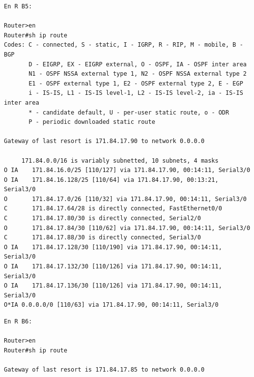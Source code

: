 \documentclass[twoside, 11pt]{article}
\begin{document}
\begin{enumerate}
\begin{center}
\begin{verbatim}
En R B5:

Router>en
Router#sh ip route
Codes: C - connected, S - static, I - IGRP, R - RIP, M - mobile, B - BGP
       D - EIGRP, EX - EIGRP external, O - OSPF, IA - OSPF inter area
       N1 - OSPF NSSA external type 1, N2 - OSPF NSSA external type 2
       E1 - OSPF external type 1, E2 - OSPF external type 2, E - EGP
       i - IS-IS, L1 - IS-IS level-1, L2 - IS-IS level-2, ia - IS-IS inter area
       * - candidate default, U - per-user static route, o - ODR
       P - periodic downloaded static route

Gateway of last resort is 171.84.17.90 to network 0.0.0.0

     171.84.0.0/16 is variably subnetted, 10 subnets, 4 masks
O IA    171.84.16.0/25 [110/127] via 171.84.17.90, 00:14:11, Serial3/0
O IA    171.84.16.128/25 [110/64] via 171.84.17.90, 00:13:21, Serial3/0
O       171.84.17.0/26 [110/32] via 171.84.17.90, 00:14:11, Serial3/0
C       171.84.17.64/28 is directly connected, FastEthernet0/0
C       171.84.17.80/30 is directly connected, Serial2/0
O       171.84.17.84/30 [110/62] via 171.84.17.90, 00:14:11, Serial3/0
C       171.84.17.88/30 is directly connected, Serial3/0
O IA    171.84.17.128/30 [110/190] via 171.84.17.90, 00:14:11, Serial3/0
O IA    171.84.17.132/30 [110/126] via 171.84.17.90, 00:14:11, Serial3/0
O IA    171.84.17.136/30 [110/126] via 171.84.17.90, 00:14:11, Serial3/0
O*IA 0.0.0.0/0 [110/63] via 171.84.17.90, 00:14:11, Serial3/0
\end{verbatim}
\label{list:2.2.4.1}

\begin{verbatim}
En R B6:

Router>en
Router#sh ip route

Gateway of last resort is 171.84.17.85 to network 0.0.0.0


\end{verbatim}
\end{center}
\end{enumerate}
\end{document}

